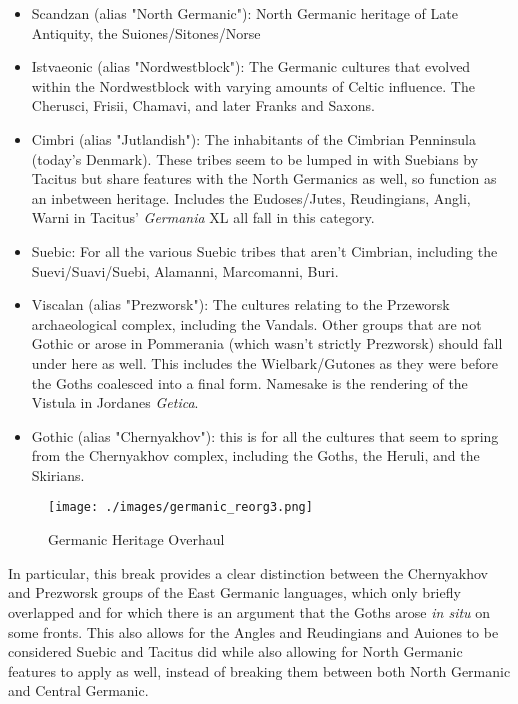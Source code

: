 \documentclass{article}
\begin{document}
	\begin{itemize}
		\item Scandzan (alias "North Germanic"):  North Germanic heritage of Late Antiquity, the Suiones/Sitones/Norse
		\item Istvaeonic (alias "Nordwestblock"): The Germanic cultures that evolved within the Nordwestblock with varying amounts of Celtic influence.
		The Cherusci, Frisii, Chamavi, and later Franks and Saxons.
		\item Cimbri (alias "Jutlandish"): The inhabitants of the Cimbrian Penninsula (today's Denmark).
		These tribes seem to be lumped in with Suebians by Tacitus but share features with the North Germanics as well, so function as an inbetween heritage.
		Includes the Eudoses/Jutes, Reudingians, Angli, Warni in Tacitus' \textit{Germania} XL all fall in this category.
		\item Suebic: For all the various Suebic tribes that aren't Cimbrian, including the Suevi/Suavi/Suebi, Alamanni, Marcomanni, Buri.
		\item Viscalan (alias "Prezworsk"): The cultures relating to the Przeworsk archaeological complex, including the Vandals.
		Other groups that are not Gothic or arose in Pommerania (which wasn't strictly Prezworsk) should fall under here as well.
		This includes the Wielbark/Gutones as they were before the Goths coalesced into a final form.
		Namesake is the rendering of the Vistula in Jordanes \textit{Getica}.
		\item Gothic (alias "Chernyakhov"): this is for all the cultures that seem to spring from the Chernyakhov complex, including the Goths, the Heruli, and the Skirians.
	\end{itemize}
	
	\begin{figure}[h!]
		\centering
		\texttt{[image: ./images/germanic\_reorg3.png]}
		\caption{Germanic Heritage Overhaul}
	\end{figure}
	
	In particular, this break provides a clear distinction between the Chernyakhov and Prezworsk groups of the East Germanic languages, which only briefly overlapped and for which there is an argument that the Goths arose \textit{in situ} on some fronts.
	This also allows for the Angles and Reudingians and Auiones to be considered Suebic and Tacitus did while also allowing for North Germanic features to apply as well, instead of breaking them between both North Germanic and Central Germanic.
	
\end{document}
